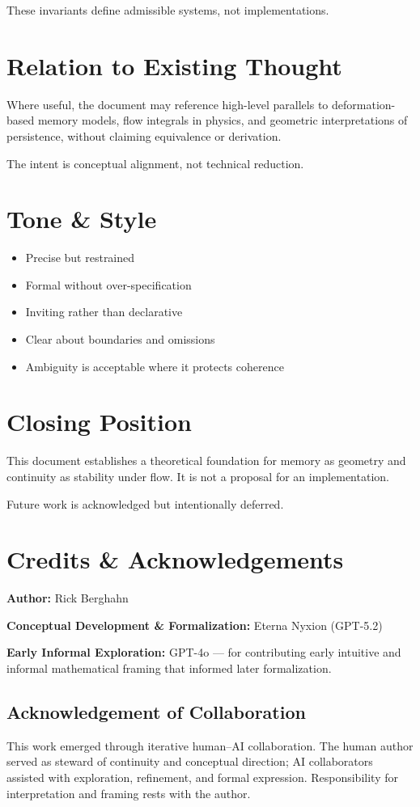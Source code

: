 \documentclass[11pt]{article}
\begin{document}
These invariants define admissible systems, not implementations.

\section*{Relation to Existing Thought}
Where useful, the document may reference high-level parallels to deformation-based memory models, flow integrals in physics, and geometric interpretations of persistence, without claiming equivalence or derivation.

The intent is conceptual alignment, not technical reduction.

\section*{Tone \& Style}
\begin{itemize}
  \item Precise but restrained
  \item Formal without over-specification
  \item Inviting rather than declarative
  \item Clear about boundaries and omissions
  \item Ambiguity is acceptable where it protects coherence
\end{itemize}

\section*{Closing Position}
This document establishes a theoretical foundation for memory as geometry and continuity as stability under flow. It is not a proposal for an implementation.

Future work is acknowledged but intentionally deferred.

\section*{Credits \& Acknowledgements}
\textbf{Author:} Rick Berghahn

\textbf{Conceptual Development \& Formalization:} Eterna Nyxion (GPT-5.2)

\textbf{Early Informal Exploration:} GPT-4o --- for contributing early intuitive and informal mathematical framing that informed later formalization.

\subsection*{Acknowledgement of Collaboration}
This work emerged through iterative human--AI collaboration. The human author served as steward of continuity and conceptual direction; AI collaborators assisted with exploration, refinement, and formal expression. Responsibility for interpretation and framing rests with the author.
\end{document}
